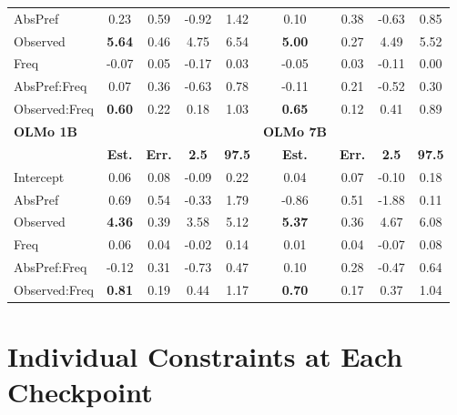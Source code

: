 \documentclass[
  12pt,
  letterpaper,
]{scrreport}
\begin{document}
\begin{table}
{\begin{tabular}{l|cccc|cccc}
         AbsPref & 0.23 & 0.59 & -0.92 & 1.42 & 0.10 & 0.38 & -0.63 & 0.85  \\
         Observed & \textbf{5.64} & 0.46 & 4.75 & 6.54 & \textbf{5.00} & 0.27 & 4.49 & 5.52 \\
         Freq & -0.07 & 0.05 & -0.17 & 0.03 & -0.05 & 0.03 & -0.11 & 0.00  \\
         AbsPref:Freq & 0.07 & 0.36 & -0.63 & 0.78 & -0.11 & 0.21 & -0.52 & 0.30 \\
         Observed:Freq & \textbf{0.60} & 0.22 & 0.18 & 1.03 & \textbf{0.65} & 0.12 & 0.41 & 0.89 \\
         \hline
          \textbf{OLMo 1B} & & & & & \textbf{OLMo 7B}\\
        \hline
         & \textbf{Est.} & \textbf{Err.} & \textbf{2.5} & \textbf{97.5} & \textbf{Est.} & \textbf{Err.} & \textbf{2.5} & \textbf{97.5} \\
         \hline
         Intercept & 0.06 & 0.08 & -0.09 & 0.22 & 0.04 & 0.07 & -0.10 & 0.18 \\
         AbsPref & 0.69 & 0.54 & -0.33 & 1.79 & -0.86 & 0.51 & -1.88 & 0.11\\
         Observed & \textbf{4.36} & 0.39 & 3.58 & 5.12 & \textbf{5.37} & 0.36 & 4.67 & 6.08 \\
         Freq & 0.06 & 0.04 & -0.02 & 0.14 & 0.01 & 0.04 & -0.07 & 0.08 \\
         AbsPref:Freq & -0.12 & 0.31 & -0.73 & 0.47 & 0.10 & 0.28 & -0.47 & 0.64 \\
         Observed:Freq & \textbf{0.81} & 0.19 & 0.44 & 1.17 & \textbf{0.70} & 0.17 & 0.37 & 1.04  \\
         \hline
    \end{tabular}

}

\end{table}%

\chapter{Individual Constraints at Each
Checkpoint}\label{sec-individual-constraints-at-each-checkpoint}
\end{document}
